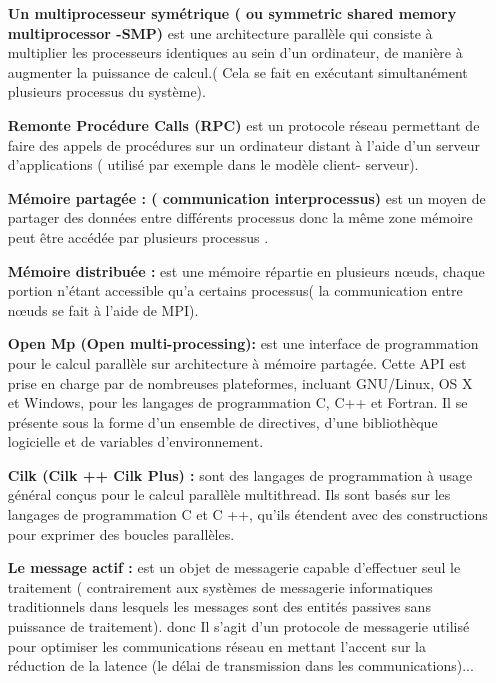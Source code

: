 \documentclass[12pt,titlepage]{article}
\begin{document}
\begin{itemize}
\item[\textbf{ Un multiprocesseur symétrique ( ou symmetric shared memory multiprocessor -SMP) } ] est une architecture parallèle qui consiste à multiplier les processeurs identiques au sein d'un ordinateur, de manière à augmenter la puissance de calcul.( Cela se fait en exécutant simultanément plusieurs processus du système).

\item[\textbf{ Remonte Procédure Calls (RPC) }] est un protocole réseau permettant de faire des appels de procédures sur un ordinateur distant à l’aide d’un serveur d’applications ( utilisé par exemple dans le modèle client- serveur).

\item[\textbf{ Mémoire partagée : ( communication interprocessus) } ] est un moyen de partager des données entre différents processus donc la même zone mémoire peut être accédée par plusieurs processus .

\item[\textbf{ Mémoire distribuée : }] est une mémoire répartie en plusieurs nœuds, chaque portion n’étant accessible qu’a certains processus( la communication entre nœuds se fait à l’aide de MPI).

\item[\textbf{ Open Mp (Open multi-processing):}] est une interface de programmation pour le calcul parallèle sur architecture à mémoire partagée. Cette API est prise en charge par de nombreuses plateformes, incluant GNU/Linux, OS X et Windows, pour les langages de programmation C, C++ et Fortran. Il se présente sous la forme d'un ensemble de directives, d'une bibliothèque logicielle et de variables d'environnement. 

\item[\textbf{ Cilk (Cilk ++ Cilk Plus) :}] sont des langages de programmation à usage général conçus pour le calcul parallèle multithread. Ils sont basés sur les langages de programmation C et C ++, qu'ils étendent avec des constructions pour exprimer des boucles parallèles.

\item[\textbf{ Le message actif :}] est un objet de messagerie capable d'effectuer seul le traitement ( contrairement aux systèmes de messagerie informatiques traditionnels dans lesquels les messages sont des entités passives sans puissance de traitement). donc Il s'agit d'un protocole de messagerie utilisé pour optimiser les communications réseau en mettant l'accent sur la réduction de la latence (le délai de transmission dans les communications)...


\end{itemize}
\end{document}
